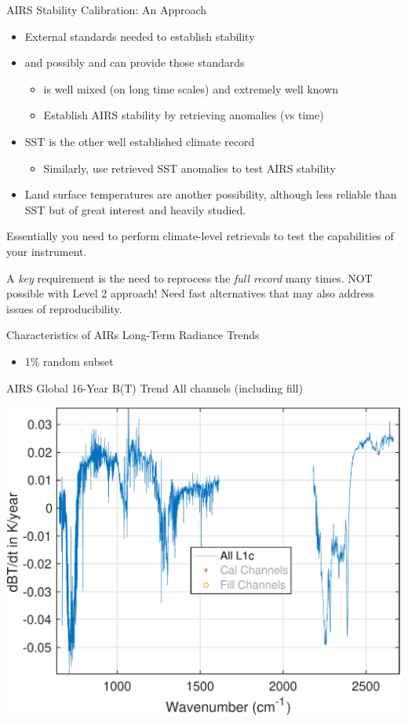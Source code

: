 \documentclass[10pt,t]{beamer}
\begin{document}
\begin{frame}[label={sec:org081e89d}]{AIRS Stability Calibration: An Approach}
\begin{itemize}
\item External standards needed to establish stability
\item \cd and possibly \nitrous and \methane can provide those standards
\begin{itemize}
\item \cd is well mixed (on long time scales) and extremely well known
\item Establish AIRS stability by retrieving \cd anomalies (vs time)
\end{itemize}
\item SST is the other well established climate record
\begin{itemize}
\item Similarly, use retrieved SST anomalies to test AIRS stability
\end{itemize}
\item Land surface temperatures are another possibility, although less reliable than SST but of great interest and heavily studied.
\end{itemize}

Essentially you need to perform climate-level retrievals to test the capabilities of your instrument.  

A \emph{key} requirement is the need to reprocess the \emph{full record} many times.  NOT possible with Level 2 approach!  Need fast alternatives that may also address issues of reproducibility.
\end{frame}

\begin{frame}[label={sec:org8b01e67}]{Characteristics of AIRs Long-Term Radiance Trends}
\begin{itemize}
\item 1\% random subset
\end{itemize}
\end{frame}
\begin{frame}[label={sec:orgfef225e}]{AIRS Global 16-Year B(T) Trend}
All channels (including fill)

\begin{center}
\includegraphics[width=0.85\linewidth]{./Figs/Pdf/rand_global_trend_l1c_overview.pdf}
\end{center}
\end{frame}
\end{document}
